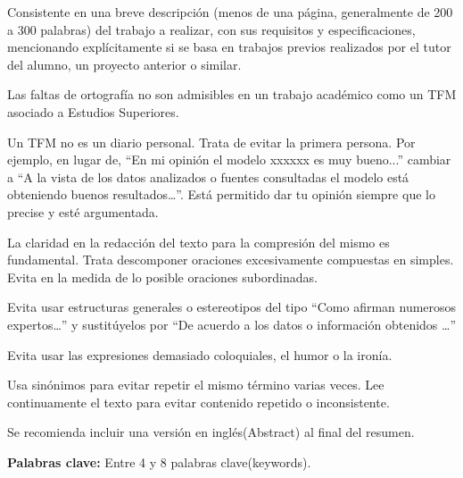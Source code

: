 

Consistente en una breve descripción (menos de una página, generalmente de 200 a 300 palabras) del trabajo a realizar, con sus requisitos y especificaciones, mencionando explícitamente si se basa en trabajos previos realizados por el tutor del alumno, un proyecto anterior o similar.

Las faltas de ortografía no son admisibles en un trabajo académico como un TFM asociado a Estudios Superiores.

Un TFM no es un diario personal. Trata de evitar la primera persona. Por ejemplo, en lugar de, “En mi opinión el modelo xxxxxx es muy bueno...” cambiar a “A la vista de los datos analizados o fuentes consultadas el modelo está obteniendo buenos resultados…”. Está permitido dar tu opinión siempre que lo precise y esté argumentada.

La claridad en la redacción del texto para la compresión del mismo es fundamental. Trata descomponer oraciones excesivamente compuestas en simples. Evita en la medida de lo posible oraciones subordinadas.

Evita usar estructuras generales o estereotipos del tipo “Como afirman numerosos expertos…” y sustitúyelos por “De acuerdo a los datos o información obtenidos …”

Evita usar las expresiones demasiado coloquiales, el humor o la ironía.

Usa sinónimos para evitar repetir el mismo término varias veces. Lee continuamente el texto para evitar contenido repetido o inconsistente.

Se recomienda incluir una versión en inglés(Abstract) al final del resumen.

\textbf{Palabras clave:} Entre 4 y 8 palabras clave(keywords).
